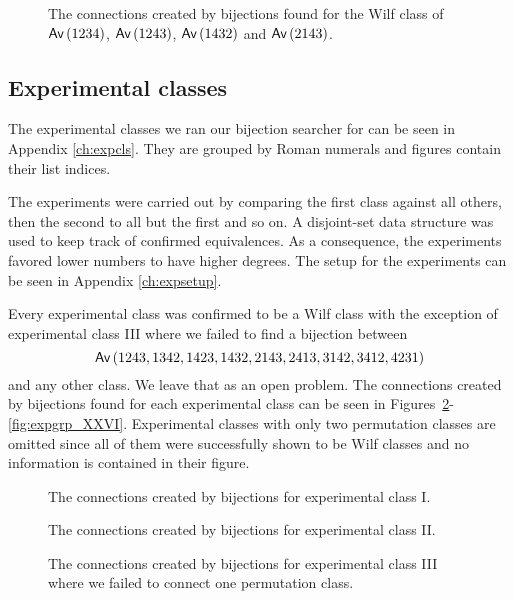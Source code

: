\begin{figure}[ht!]
    \centering
    
    \caption{The connections created by bijections found for the Wilf class of $\textsf{Av}\left(1234\right)$, $\textsf{Av}\left(1243\right)$, $\textsf{Av}\left(1432\right)$ and $\textsf{Av}\left(2143\right)$.}
    \label{fig:1x4bi}
\end{figure}

\subsection{Experimental classes}
The experimental classes we ran our bijection searcher for can be seen in Appendix \ref{ch:expcls}. They are grouped by Roman numerals and figures contain their list indices.

The experiments were carried out by comparing the first class against all others, then the second to all but the first and so on. A disjoint-set data structure was used to keep track of confirmed equivalences. As a consequence, the experiments favored lower numbers to have higher degrees. The setup for the experiments can be seen in Appendix \ref{ch:expsetup}.

Every experimental class was confirmed to be a Wilf class with the exception of experimental class III where we failed to find a bijection between
\[
    \textsf{Av}\left(1243,1342,1423,1432,2143,2413,3142,3412,4231\right)
\]
and any other class. We leave that as an open problem. The connections created by bijections found for each experimental class can be seen in Figures~\ref{fig:expgrp_I}-\ref{fig:expgrp_XXVI}. Experimental classes with only two permutation classes are omitted since all of them were successfully shown to be Wilf classes and no information is contained in their figure.


\begin{figure}[ht!]
    \centering
    
    \caption{The connections created by bijections for experimental class I.}
    \label{fig:expgrp_I}
\end{figure}


\begin{figure}[ht!]
    \centering
    
    \caption{The connections created by bijections for experimental class II.}
    \label{fig:expgrp_II}
\end{figure}


\begin{figure}[ht!]
    \centering
    
    \caption{The connections created by bijections for experimental class III where we failed to connect one permutation class.}
    \label{fig:expgrp_III}
\end{figure}


